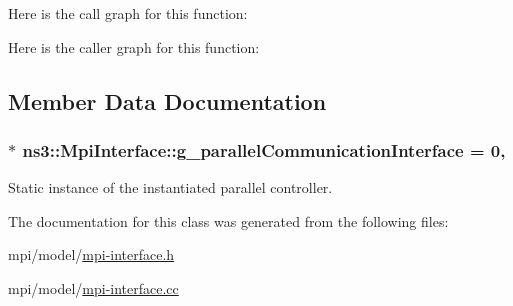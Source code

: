 Here is the call graph for this function\+:




Here is the caller graph for this function\+:




\subsection{Member Data Documentation}
\subsubsection[{\texorpdfstring{g\+\_\+parallel\+Communication\+Interface}{g_parallelCommunicationInterface}}]{ $\ast$ ns3\+::\+Mpi\+Interface\+::g\+\_\+parallel\+Communication\+Interface = 0\hspace{0.3cm}{\ttfamily [static]}, {\ttfamily [private]}}\hypertarget{classns3_1_1MpiInterface_a271d0de418ec6c13f332ae26995c072f}{}\label{classns3_1_1MpiInterface_a271d0de418ec6c13f332ae26995c072f}
Static instance of the instantiated parallel controller. 

The documentation for this class was generated from the following files\+:\begin{DoxyCompactItemize}
\item 
mpi/model/\hyperlink{mpi-interface_8h}{mpi-\/interface.\+h}\item 
mpi/model/\hyperlink{mpi-interface_8cc}{mpi-\/interface.\+cc}\end{DoxyCompactItemize}
